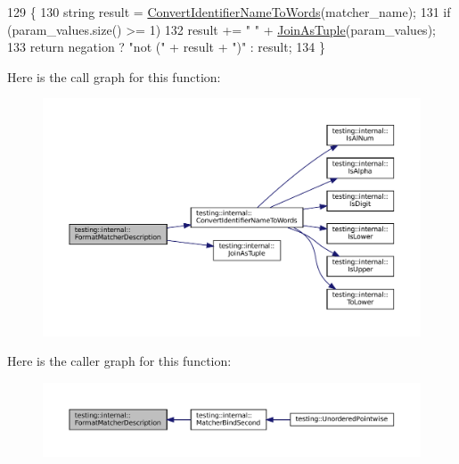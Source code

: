 \begin{DoxyCode}
129                                                                         \{
130   \textcolor{keywordtype}{string} result = \hyperlink{namespacetesting_1_1internal_a571db854f6de337007c53573c9cbf8a3}{ConvertIdentifierNameToWords}(matcher\_name);
131   \textcolor{keywordflow}{if} (param\_values.size() >= 1)
132     result += \textcolor{stringliteral}{" "} + \hyperlink{namespacetesting_1_1internal_a61d60981533cb0875bad9025e0d98b74}{JoinAsTuple}(param\_values);
133   \textcolor{keywordflow}{return} negation ? \textcolor{stringliteral}{"not ("} + result + \textcolor{stringliteral}{")"} : result;
134 \}
\end{DoxyCode}
Here is the call graph for this function\+:
\nopagebreak
\begin{figure}[H]
\begin{center}
\leavevmode
\includegraphics[width=350pt]{namespacetesting_1_1internal_a593b52fcbb46a765a31850661b1960f4_cgraph}
\end{center}
\end{figure}
Here is the caller graph for this function\+:
\nopagebreak
\begin{figure}[H]
\begin{center}
\leavevmode
\includegraphics[width=350pt]{namespacetesting_1_1internal_a593b52fcbb46a765a31850661b1960f4_icgraph}
\end{center}
\end{figure}
\mbox{\label{namespacetesting_1_1internal_a904485f27a54be8a5a92856e2d838797}} 
